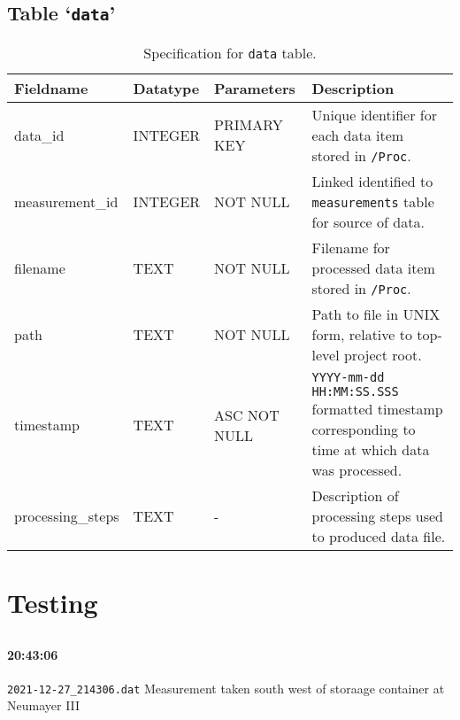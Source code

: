 \documentclass[a4paper]{article}
\newcommand{\sqlspectable}[2]{
    \renewcommand{\arraystretch}{1.5}
    \rowcolors{2}{gray!10}{white}
    \begin{longtable}{l l >{\raggedright}p{3cm} >{\raggedright\arraybackslash}p{4cm}}
        \caption{#2} \\
        \hline
        \textbf{Fieldname} & \textbf{Datatype} & \textbf{Parameters} & \textbf{Description}\\
        \hline
        \endhead
        \hline
        \endfoot
        #1
    \end{longtable}
}
\begin{document}
    \subsection{Table `\texttt{data}'}
    \sqlspectable{
        data\_id & INTEGER & PRIMARY KEY & 
        Unique identifier for each data item stored in \texttt{/Proc}. \\
        measurement\_id & INTEGER & NOT NULL &
        Linked identified to \texttt{measurements} table for source of
        data. \\
        filename & TEXT & NOT NULL &
        Filename for processed data item stored in \texttt{/Proc}. \\
        path & TEXT & NOT NULL & 
        Path to file in UNIX form, relative to top-level project root. \\
        timestamp&  TEXT & ASC NOT NULL &
        \texttt{YYYY-mm-dd HH:MM:SS.SSS} formatted timestamp corresponding
        to time at which data was processed. \\
        processing\_steps & TEXT & - & 
        Description of processing steps used to produced data file. \\
    }
    {Specification for \texttt{data} table.}
    

    \newpage

    \section{Testing}
    \subsection{}
    
    \paragraph{20:43:06} \texttt{2021-12-27\_214306.dat} Measurement taken south west of storaage container at Neumayer III
    
    \subsection{}

    \subsection{}
\end{document}
